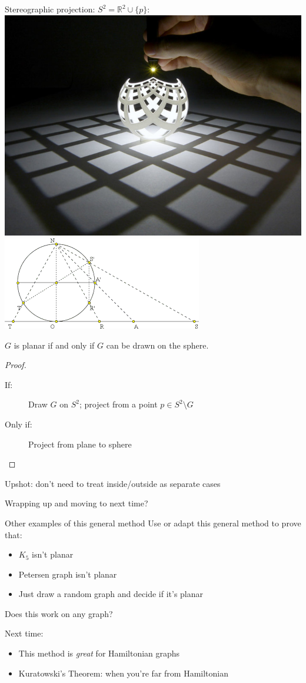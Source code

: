 \documentclass{beamer}
\begin{document}
\begin{frame}{Stereographic projection: $S^2=\mathbb{R}^2\cup \{p\}$:}
  \includegraphics[width=.4\textwidth]{Pictures/stereographicSegerman.jpg}
  \includegraphics[width=.6\textwidth]{Pictures/stereographic2d.png}
\begin{corollary}
$G$ is planar if and only if $G$ can be drawn on the sphere.
  \end{corollary}
\begin{proof}
\begin{description}
    \item[If:] Draw $G$ on $S^2$; project from a point $p\in S^2\setminus G$
   \item[Only if:] Project from plane to sphere
     \end{description}
  \end{proof}
\begin{block}{Upshot: don't need to treat inside/outside as separate cases}
  \end{block}

\end{frame}

\begin{frame}{Wrapping up and moving to next time?}

\begin{block}{Other examples of this general method}  
Use or adapt this general method to prove that:
  \begin{itemize}
  \item $K_5$ isn't planar
  \item Petersen graph isn't planar
  \item Just draw a random graph and decide if it's planar
  \end{itemize}
Does this work on any graph?
\end{block}

  
  \begin{block}{Next time:}
    \begin{itemize}
    \item  This method is \emph{great} for Hamiltonian graphs
    \item Kuratowski's Theorem: when you're far from Hamiltonian
      \end{itemize}
\end{block}
\end{frame}
\end{document}

